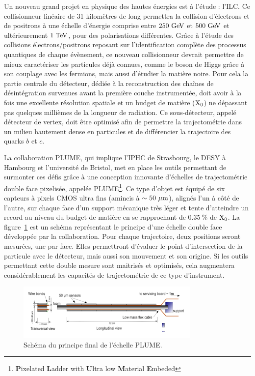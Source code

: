   Un nouveau grand projet en physique des hautes énergies est à l'étude : l'\acrfull{ILC}. 
  Ce collisionneur linéaire de 31 kilomètres de long permettra la collision d'électrons et de positrons à une échelle d'énergie comprise entre $250~\rm{GeV}$ et $500~\rm{GeV}$ et ultérieurement $1~\rm{TeV}$, pour des polarisations différentes.
  Grâce à l'étude des collisions électrons/positrons reposant sur l'identification complète des processus quantiques de chaque évènement, ce nouveau collisionneur devrait permettre de mieux caractériser les particules déjà connues, comme le boson de Higgs grâce à son couplage avec les fermions, mais aussi d'étudier la matière noire.
  Pour cela la partie centrale du détecteur, dédiée à la reconstruction des chaînes de désintégration survenues avant la première couche instrumentée, doit avoir à la fois une excellente résolution spatiale et un budget de matière ($\rm{X_0}$) ne dépassant pas quelques millièmes de la longueur de radiation. 
  Ce sous-détecteur, appelé détecteur de vertex, doit être optimisé afin de permettre la trajectométrie dans un milieu hautement dense en particules et de différencier la trajectoire des quarks $b$ et $c$.

  La collaboration PLUME, qui implique l'IPHC de Strasbourg, le DESY à Hambourg et l'université de Bristol, met en place les outils permettant de surmonter ces défis grâce à une conception innovante d'échelles de trajectométrie double face pixelisée, appelée PLUME\footnote{\textbf{P}ixelated \textbf{L}adder with \textbf{U}ltra low \textbf{M}aterial \textbf{E}mbeded}\cite{PLUME}. 
  Ce type d'objet est équipé de six capteurs à pixels CMOS ultra fins (amincis à $\sim 50~\rm{\mu m}$), alignés l'un à côté de l'autre, sur chaque face d'un support mécanique très léger et tente d'atteindre un record au niveau du budget de matière en se rapprochant de $0.35~\%$ de $\rm{X_0}$.
  La figure~\ref{fig:PLUME_resume} est un schéma représentant le principe d'une échelle double face développée par la collaboration.
  Pour chaque trajectoire, deux positions seront mesurées, une par face. 
  Elles permettront d'évaluer le point d'intersection de la particule avec le détecteur, mais aussi son mouvement et son origine. 
  Si les outils permettant cette double mesure sont maitrisés et optimisés, cela augmentera considérablement les capacités de trajectométrie de ce type d'instrument.

  \begin{figure}
    \centering
    \includegraphics[width = 0.8\textwidth]{Pictures/vxd/plume_finalGoal.png}
    \caption{Schéma du principe final de l'échelle PLUME.}
    \label{fig:PLUME_resume}
  \end{figure}

